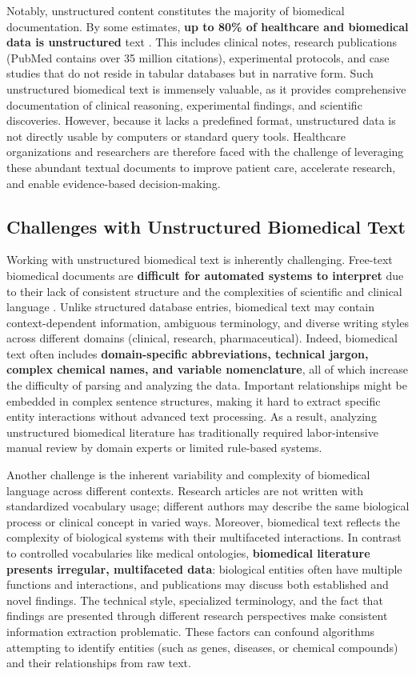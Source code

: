 Notably, unstructured content constitutes the majority of biomedical documentation. By some estimates, \textbf{up to 80\% of healthcare and biomedical data is unstructured} text \parencite{Kong2019}. This includes clinical notes, research publications (PubMed contains over 35 million citations), experimental protocols, and case studies that do not reside in tabular databases but in narrative form. Such unstructured biomedical text is immensely valuable, as it provides comprehensive documentation of clinical reasoning, experimental findings, and scientific discoveries. However, because it lacks a predefined format, unstructured data is not directly usable by computers or standard query tools. Healthcare organizations and researchers are therefore faced with the challenge of leveraging these abundant textual documents to improve patient care, accelerate research, and enable evidence-based decision-making.

\subsection{Challenges with Unstructured Biomedical Text}

Working with unstructured biomedical text is inherently challenging. Free-text biomedical documents are \textbf{difficult for automated systems to interpret} due to their lack of consistent structure and the complexities of scientific and clinical language \parencite{Stenetorp2024}. Unlike structured database entries, biomedical text may contain context-dependent information, ambiguous terminology, and diverse writing styles across different domains (clinical, research, pharmaceutical). Indeed, biomedical text often includes \textbf{domain-specific abbreviations, technical jargon, complex chemical names, and variable nomenclature}, all of which increase the difficulty of parsing and analyzing the data. Important relationships might be embedded in complex sentence structures, making it hard to extract specific entity interactions without advanced text processing. As a result, analyzing unstructured biomedical literature has traditionally required labor-intensive manual review by domain experts or limited rule-based systems.

Another challenge is the inherent variability and complexity of biomedical language across different contexts. Research articles are not written with standardized vocabulary usage; different authors may describe the same biological process or clinical concept in varied ways. Moreover, biomedical text reflects the complexity of biological systems with their multifaceted interactions. In contrast to controlled vocabularies like medical ontologies, \textbf{biomedical literature presents irregular, multifaceted data}: biological entities often have multiple functions and interactions, and publications may discuss both established and novel findings. The technical style, specialized terminology, and the fact that findings are presented through different research perspectives make consistent information extraction problematic. These factors can confound algorithms attempting to identify entities (such as genes, diseases, or chemical compounds) and their relationships from raw text.

